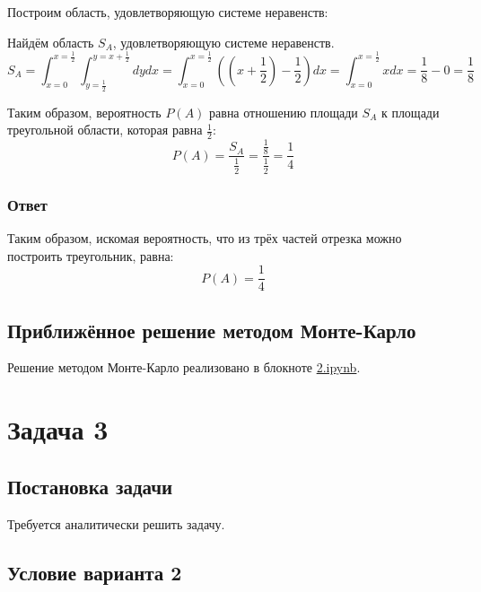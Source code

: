 \documentclass[a4paper,14pt]{extarticle}
\begin{document}
                Построим область, удовлетворяющую системе неравенств:
                
                Найдём область \( S_A \), удовлетворяющую системе неравенств.
                \[
                    S_A =
                    \int_{x = 0}^{x = \frac{1}{2}}
                    \int_{y = \frac{1}{2}}^{y = x + \frac{1}{2}} dy dx =
                    \int_{x = 0}^{x = \frac{1}{2}}
                    ((x + \frac{1}{2}) - \frac{1}{2}) dx =
                    \int_{x = 0}^{x = \frac{1}{2}} x dx =
                    \frac{1}{8} - 0 = \frac{1}{8}
                \]
                
                Таким образом, вероятность \( P(A) \) равна отношению площади \( S_A \) к площади треугольной области, которая равна \( \frac{1}{2} \):
                \[
                    P(A) = \frac{S_A}{\frac{1}{2}} = \frac{\frac{1}{8}}{\frac{1}{2}} = \frac{1}{4}
                \]
            
            \subsubsection*{Ответ}
                Таким образом, искомая вероятность, что из трёх частей отрезка можно построить треугольник, равна:
                \[
                    \boxed{P(A) = \frac{1}{4}}
                \]
        
        \subsection*{Приближённое решение методом Монте-Карло}
            Решение методом Монте-Карло реализовано в блокноте \href{https://github.com/vorandpav/TVIPS}{2.ipynb}.


    
    
    \section*{Задача 3}
        
        \subsection*{Постановка задачи}
            
            Требуется аналитически решить задачу.
        
        \subsection*{Условие варианта 2}
            
\end{document}
